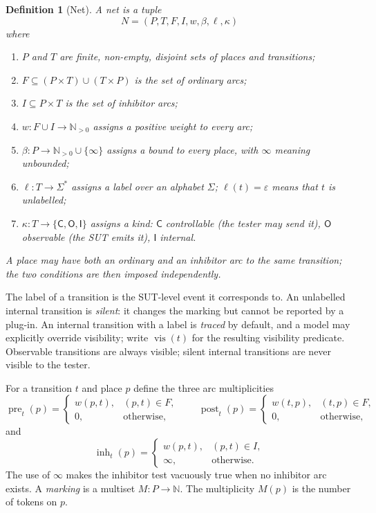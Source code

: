 \documentclass[11pt,a4paper]{article}
\newtheorem{definition}{Definition}[section]
\newcommand{\N}{\mathbb{N}}
\newcommand{\Npos}{\mathbb{N}_{>0}}
\newcommand{\pre}{\operatorname{pre}}
\newcommand{\post}{\operatorname{post}}
\newcommand{\inh}{\operatorname{inh}}
\newcommand{\vis}{\operatorname{vis}}
\begin{document}
\begin{definition}[Net]\label{def:net}
A \emph{net} is a tuple
\[
  N=(P,T,F,I,w,\beta,\ell,\kappa)
\]
where
\begin{enumerate}[label=(\roman*),leftmargin=2.2em]
  \item $P$ and $T$ are finite, non-empty, disjoint sets of \emph{places} and
        \emph{transitions};
  \item $F\subseteq (P\times T)\cup(T\times P)$ is the set of \emph{ordinary
        arcs};
  \item $I\subseteq P\times T$ is the set of \emph{inhibitor arcs};
  \item $w\colon F\cup I\to\Npos$ assigns a positive \emph{weight} to every
        arc;
  \item $\beta\colon P\to\Npos\cup\{\infty\}$ assigns a \emph{bound} to every
        place, with $\infty$ meaning unbounded;
  \item $\ell\colon T\to\Sigma^{*}$ assigns a label over an alphabet $\Sigma$;
        $\ell(t)=\varepsilon$ means that $t$ is \emph{unlabelled};
  \item $\kappa\colon T\to\{\mathsf{C},\mathsf{O},\mathsf{I}\}$ assigns a
        \emph{kind}: $\mathsf{C}$ controllable (the tester may send it),
        $\mathsf{O}$ observable (the SUT emits it), $\mathsf{I}$ internal.
\end{enumerate}
A place may have both an ordinary and an inhibitor arc to the same transition;
the two conditions are then imposed independently.
\end{definition}

The label of a transition is the SUT-level event it corresponds to.  An
unlabelled internal transition is \emph{silent}: it changes the marking but
cannot be reported by a plug-in.  An internal transition with a label is
\emph{traced} by default, and a model may explicitly override visibility;
write $\vis(t)$ for the resulting visibility predicate.  Observable
transitions are always visible; silent internal transitions are never visible
to the tester.

For a transition $t$ and place $p$ define the three arc multiplicities
\[
  \pre_t(p)=
  \begin{cases}
    w(p,t), & (p,t)\in F,\\
    0, & \text{otherwise},
  \end{cases}
  \qquad
  \post_t(p)=
  \begin{cases}
    w(t,p), & (t,p)\in F,\\
    0, & \text{otherwise},
  \end{cases}
\]
and
\[
  \inh_t(p)=
  \begin{cases}
    w(p,t), & (p,t)\in I,\\
    \infty, & \text{otherwise}.
  \end{cases}
\]
The use of $\infty$ makes the inhibitor test vacuously true when no inhibitor
arc exists.  A \emph{marking} is a multiset $M\colon P\to\N$.  The
multiplicity $M(p)$ is the number of tokens on $p$.
\end{document}
